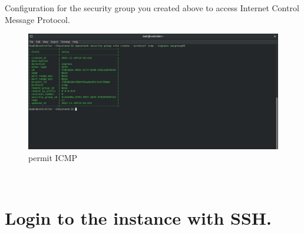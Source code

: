 \begin{spacing}{1.2}
\par Configuration for the security group you created above to access Internet Control Message Protocol.
\\
\begin{figure}[!htb] 
\begin{center} 
\includegraphics[width=1\linewidth]{Cloud/Creating and Running Instances/permit ICMP} 
\end{center} 
\caption{permit ICMP} 
\end{figure} 
\FloatBarrier
\\
\section{Login to the instance with SSH.}


\end{spacing}
